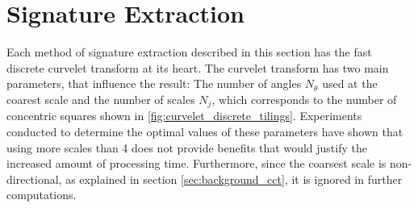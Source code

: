 \section{Signature Extraction}

Each method of signature extraction described in this section has the fast
discrete curvelet transform at its heart. The curvelet transform has two main
parameters, that influence the result: The number of angles $N_{\theta}$ used
at the coarest scale and the number of scales $N_j$, which corresponds to the
number of concentric squares shown in \ref{fig:curvelet_discrete_tilings}.
Experiments conducted to determine the optimal values of these parameters have
shown that using more scales than 4 does not provide benefits that would
justify the increased amount of processing time. Furthermore, since the
coarsest scale is non-directional, as explained in section
\ref{sec:background_cct}, it is ignored in further computations.


